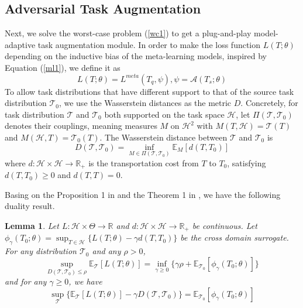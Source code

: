 \documentclass{article}
\newtheorem{lemma}[theorem]{Lemma}
\begin{document}
\subsection{Adversarial Task Augmentation}\label{sec32}
Next, we solve the worst-case problem (\ref{wc1}) to get a plug-and-play model-adaptive task augmentation module. In order to make the loss function $L(T;\theta)$ depending on the inductive bias of the meta-learning models, inspired by Equation (\ref{ml1}), we define it as
\begin{equation}\label{loss}
  L(T;\theta)=L^{meta}(T_q,\psi),\psi=\mathcal{A}(T_s;\theta)
\end{equation}
To allow task distributions that have different support to that of the source task distribution $\mathcal{T}_0$, we use the Wasserstein distances as the metric $D$. Concretely, for task distribution $\mathcal{T}$ and $\mathcal{T}_0$ both supported on the task space $\mathcal{H}$, let $\Pi(\mathcal{T},\mathcal{T}_0)$ denotes their couplings, meaning measures $M$ on $\mathcal{H}^2$ with $M(T,\mathcal{H})=\mathcal{T}(T)$ and $M(\mathcal{H},T)=\mathcal{T}_0(T)$. The Wasserstein distance between $\mathcal{T}$ and $\mathcal{T}_0$ is
\begin{equation}\label{dis}
    D(\mathcal{T},\mathcal{T}_0)=\inf_{M\in\Pi(\mathcal{T},\mathcal{T}_0)}\mathbb{E}_M[d(T,T_0)]
\end{equation}
where $d:\mathcal{H}\times\mathcal{H}\rightarrow\mathbb{R}_+$ is the transportation cost from $T$ to $T_0$, satisfying $d(T,T_0)\geq0$ and $d(T,T)=0$.

Basing on the Proposition 1 in \cite{DBLP:conf/iclr/SinhaND18} and the Theorem 1 in \cite{blanchet2019quantifying}, we have the following duality result.
\begin{lemma}\label{lm1}
Let $L:\mathcal{H}\times\Theta\rightarrow\mathbb{R}$ and $d:\mathcal{H}\times\mathcal{H}\rightarrow\mathbb{R}_+$ be continuous. Let $\phi_{\gamma}(T_0;\theta)=\sup_{T\in\mathcal{H}}\{L(T;\theta)-\gamma d(T,T_0)\}$ be the cross domain surrogate. For any distribution $\mathcal{T}_0$ and any $\rho>0$,
\begin{equation}
    \sup_{D(\mathcal{T},\mathcal{T}_0)\leq\rho}\mathbb{E}_{\mathcal{T}}[L(T;\theta)]=\inf_{\gamma\geq0}\{\gamma\rho+\mathbb{E}_{\mathcal{T}_0}[\phi_{\gamma}(T_0;\theta)]\}
\end{equation}
and for any $\gamma\geq0$, we have
\begin{equation}
    \sup_{\mathcal{T}}\{\mathbb{E}_{\mathcal{T}}[L(T;\theta)]-\gamma D(\mathcal{T},\mathcal{T}_0)\}=\mathbb{E}_{\mathcal{T}_0}[\phi_{\gamma}(T_0;\theta)]
\end{equation}
\end{lemma}
\end{document}
